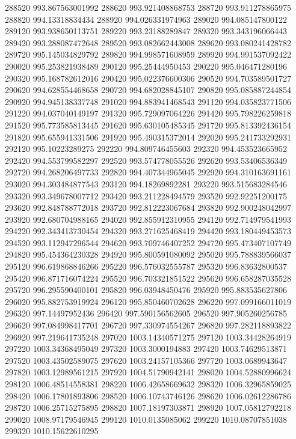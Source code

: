 {288520 993.867563001992
288620 993.921408868753
288720 993.911278865975
288820 994.13318834434
288920 994.026331974963
289020 994.085147800122
289120 993.938650113751
289220 993.23188289847
289320 993.343196066443
289420 993.288087472648
289520 993.082662443008
289620 993.080241428782
289720 995.145034829792
289820 994.998571608959
289920 994.991537092422
290020 995.253821938489
290120 995.25444950453
290220 995.046471280196
290320 995.168782612016
290420 995.022376600306
290520 994.703589501727
290620 994.628554468658
290720 994.682028845107
290820 995.085887244854
290920 994.945138337748
291020 994.883941468543
291120 994.035823771506
291220 994.037040149197
291320 995.729097064226
291420 995.798226259818
291520 995.773585813445
291620 995.630105485345
291720 995.813392436154
291820 995.655941331506
291920 995.490315372014
292020 995.241733292931
292120 995.10223289275
292220 994.809746455603
292320 994.453523665952
292420 994.553799582297
292520 993.574778055526
292620 993.53406536349
292720 994.268206497733
292820 994.407344965045
292920 994.310163691161
293020 994.303484877543
293120 994.18269892281
293220 993.515683284546
293320 993.349678007712
293420 993.211228494579
293520 992.92251200175
293620 992.848788772018
293720 992.812223067684
293820 992.900248042997
293920 992.680704988165
294020 992.855912310955
294120 992.714979541993
294220 992.343413730454
294320 993.271625468419
294420 993.180449453573
294520 993.112947296544
294620 993.709746407252
294720 995.473407107749
294820 995.454364230328
294920 995.800591080092
295020 995.788839566037
295120 996.619868846266
295220 996.576032555787
295320 996.83632800537
295420 996.871716074224
295520 996.703321851522
295620 996.658287035528
295720 996.295590400101
295820 996.03948450476
295920 995.883535627806
296020 995.882753919924
296120 995.850460702628
296220 997.099166011019
296320 997.14497952436
296420 997.590156562605
296520 997.905260256785
296620 997.084998417701
296720 997.330974554267
296820 997.282118893822
296920 997.219641735248
297020 1003.14340571275
297120 1003.34428264919
297220 1003.34368495049
297320 1003.3000194883
297420 1003.74629513871
297520 1003.43502589075
297620 1003.24157105366
297720 1003.0689943647
297820 1003.12989561215
297920 1004.51790942141
298020 1004.52880996624
298120 1006.48514558381
298220 1006.42658669632
298320 1006.32965859025
298420 1006.17801893806
298520 1006.10743746126
298620 1006.02612286786
298720 1006.25715275895
298820 1007.18197303871
298920 1007.05812792218
299020 1008.97179546945
299120 1010.0135085062
299220 1010.08707851038
299320 1010.15622610295
}
